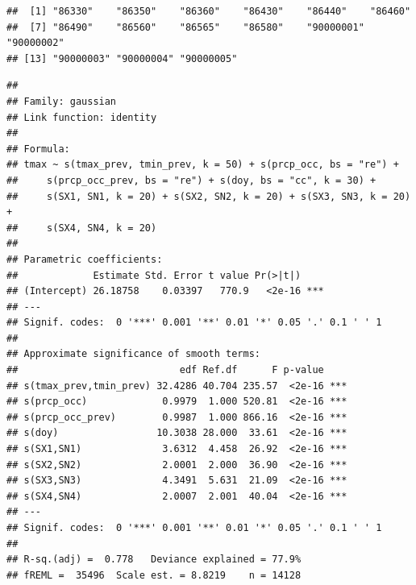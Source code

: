 \documentclass[
  12pt]{article}
\newenvironment{Shaded}{}{}
\newcommand{\CommentTok}[1]{\textcolor[rgb]{0.38,0.63,0.69}{\textit{#1}}}
\newcommand{\DataTypeTok}[1]{\textcolor[rgb]{0.56,0.13,0.00}{#1}}
\newcommand{\KeywordTok}[1]{\textcolor[rgb]{0.00,0.44,0.13}{\textbf{#1}}}
\newcommand{\NormalTok}[1]{#1}
\newcommand{\OperatorTok}[1]{\textcolor[rgb]{0.40,0.40,0.40}{#1}}
\newcommand{\StringTok}[1]{\textcolor[rgb]{0.25,0.44,0.63}{#1}}
\begin{document}
\begin{Shaded}
\end{Shaded}

\begin{verbatim}
##  [1] "86330"    "86350"    "86360"    "86430"    "86440"    "86460"   
##  [7] "86490"    "86560"    "86565"    "86580"    "90000001" "90000002"
## [13] "90000003" "90000004" "90000005"
\end{verbatim}

\begin{Shaded}
\end{Shaded}

\begin{verbatim}
## 
## Family: gaussian 
## Link function: identity 
## 
## Formula:
## tmax ~ s(tmax_prev, tmin_prev, k = 50) + s(prcp_occ, bs = "re") + 
##     s(prcp_occ_prev, bs = "re") + s(doy, bs = "cc", k = 30) + 
##     s(SX1, SN1, k = 20) + s(SX2, SN2, k = 20) + s(SX3, SN3, k = 20) + 
##     s(SX4, SN4, k = 20)
## 
## Parametric coefficients:
##             Estimate Std. Error t value Pr(>|t|)    
## (Intercept) 26.18758    0.03397   770.9   <2e-16 ***
## ---
## Signif. codes:  0 '***' 0.001 '**' 0.01 '*' 0.05 '.' 0.1 ' ' 1
## 
## Approximate significance of smooth terms:
##                            edf Ref.df      F p-value    
## s(tmax_prev,tmin_prev) 32.4286 40.704 235.57  <2e-16 ***
## s(prcp_occ)             0.9979  1.000 520.81  <2e-16 ***
## s(prcp_occ_prev)        0.9987  1.000 866.16  <2e-16 ***
## s(doy)                 10.3038 28.000  33.61  <2e-16 ***
## s(SX1,SN1)              3.6312  4.458  26.92  <2e-16 ***
## s(SX2,SN2)              2.0001  2.000  36.90  <2e-16 ***
## s(SX3,SN3)              4.3491  5.631  21.09  <2e-16 ***
## s(SX4,SN4)              2.0007  2.001  40.04  <2e-16 ***
## ---
## Signif. codes:  0 '***' 0.001 '**' 0.01 '*' 0.05 '.' 0.1 ' ' 1
## 
## R-sq.(adj) =  0.778   Deviance explained = 77.9%
## fREML =  35496  Scale est. = 8.8219    n = 14128
\end{verbatim}
\end{document}
